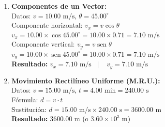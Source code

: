 \documentclass[9pt]{article}
\begin{document}
\begin{minipage}[t]{0.48\textwidth}
\begin{enumerate}
        \item \textbf{Componentes de un Vector:} \\
        Datos: $v = 10.00\text{ m/s}, \, \theta = 45.00^\circ$ \\
        Componente horizontal: $v_x = v \cos\theta$ \\
        $v_x = 10.00 \times \cos 45.00^\circ = 10.00 \times 0.71 = 7.10\text{ m/s}$ \\
        Componente vertical: $v_y = v \operatorname{sen}\theta$ \\
        $v_y = 10.00 \times \operatorname{sen} 45.00^\circ = 10.00 \times 0.71 = 7.10\text{ m/s}$ \\
        \textbf{Resultado: } $v_x = 7.10\text{ m/s} \quad | \quad v_y = 7.10\text{ m/s}$
        
        \item \textbf{Movimiento Rectilíneo Uniforme (M.R.U.):} \\
        Datos: $v = 15.00\text{ m/s}, \, t = 4.00\text{ min} = 240.00\text{ s}$ \\
        Fórmula: $d = v \cdot t$ \\
        Sustitución: $d = 15.00\text{ m/s} \times 240.00\text{ s} = 3600.00\text{ m}$ \\
        \textbf{Resultado: } $3600.00\text{ m}$ (o $3.60 \times 10^3\text{ m}$)
    \end{enumerate}
\end{minipage}
\end{document}
